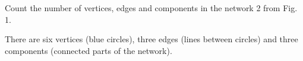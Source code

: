 Count the number of vertices, edges and components in the network 2 from Fig. 1. 

\solution
There are six vertices (blue circles), three edges (lines between circles) and three components (connected parts of the network). 

